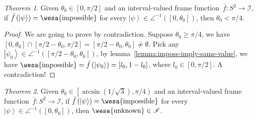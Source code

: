 \documentclass[12pt]{iopart}
\theoremstyle{remark}
\newtheorem{thm}{Theorem}
\newcommand{\imposs}{{\mbox{\wesa{impossible}}}}
\newcommand{\unknown}{{\mbox{\wesa{unknown}}}}
\newcommand{\ket}[1]{{\left\vert{#1}\right\rangle}}
\begin{document}
\begin{thm}\label{thm:pi-div-4}Given $\theta_{0}\in\left[0,\pi / 2\right]$
and an interval-valued frame function~$\bar{f}:S^{2}\rightarrow\mathscr{I}$,
if $\bar{f}\left(\ket{\psi}\right)=\imposs$ for every $\ket{\psi}\in\angle^{-1}\left(\left[0,\theta_{0}\right]\right)$,
then $\theta_{0}<\pi / 4$.\end{thm}
\begin{proof}
We are going to prove by contradiction. Suppose $\theta_{0}\ge\pi / 4$,
we have $\left[0,\theta_{0}\right]\cap\left[\pi / 2-\theta_{0},\pi / 2\right]=\left[\pi / 2-\theta_{0},\theta_{0}\right]\ne\emptyset$.
Pick any $\ket{\psi_{0}}\in\angle^{-1}\left(\left[\pi / 2-\theta_{0},\theta_{0}\right]\right)$,
by lemma~\ref{lemma:imposs-imply-same-value}, we have $\imposs=\bar{f}\left(\ket{\psi_{0}}\right)=\left[l_{0},1-l_{0}\right]$,
where $l_{0}\in\left[0,\pi / 2\right]$. A contradiction!
\end{proof}
\begin{thm}\label{thm:arcsin-one-over-sqrt-three}Given $\theta_{0}\in\left[\arcsin\left(1 / \sqrt{3}\right),\pi / 4\right)$
and an interval-valued frame function~$\bar{f}:S^{2}\rightarrow\mathscr{I}$,
if $\bar{f}\left(\ket{\psi}\right)=\imposs$ for every $\ket{\psi}\in\angle^{-1}\left(\left[0,\theta_{0}\right]\right)$,
then $\unknown\in\mathscr{I}$.\end{thm}
\end{document}
